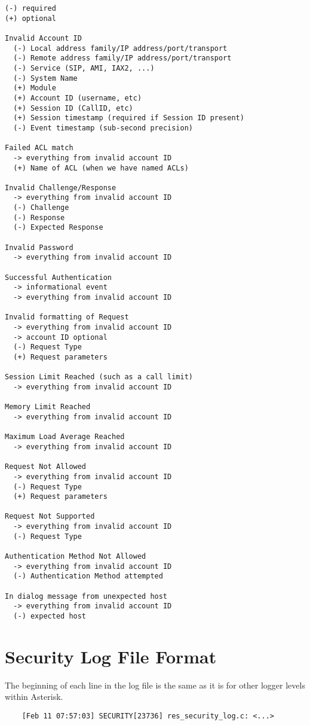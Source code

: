 \begin{verbatim}
(-) required
(+) optional

Invalid Account ID
  (-) Local address family/IP address/port/transport
  (-) Remote address family/IP address/port/transport
  (-) Service (SIP, AMI, IAX2, ...)
  (-) System Name
  (+) Module
  (+) Account ID (username, etc)
  (+) Session ID (CallID, etc)
  (+) Session timestamp (required if Session ID present)
  (-) Event timestamp (sub-second precision)

Failed ACL match
  -> everything from invalid account ID
  (+) Name of ACL (when we have named ACLs)

Invalid Challenge/Response
  -> everything from invalid account ID
  (-) Challenge
  (-) Response
  (-) Expected Response

Invalid Password
  -> everything from invalid account ID

Successful Authentication
  -> informational event
  -> everything from invalid account ID

Invalid formatting of Request
  -> everything from invalid account ID
  -> account ID optional
  (-) Request Type
  (+) Request parameters

Session Limit Reached (such as a call limit)
  -> everything from invalid account ID

Memory Limit Reached
  -> everything from invalid account ID

Maximum Load Average Reached
  -> everything from invalid account ID

Request Not Allowed
  -> everything from invalid account ID
  (-) Request Type
  (+) Request parameters

Request Not Supported
  -> everything from invalid account ID
  (-) Request Type

Authentication Method Not Allowed
  -> everything from invalid account ID
  (-) Authentication Method attempted

In dialog message from unexpected host
  -> everything from invalid account ID
  (-) expected host
\end{verbatim}

\section{Security Log File Format}

    The beginning of each line in the log file is the same as it is for other
logger levels within Asterisk.

\begin{verbatim}
    [Feb 11 07:57:03] SECURITY[23736] res_security_log.c: <...>
\end{verbatim}

